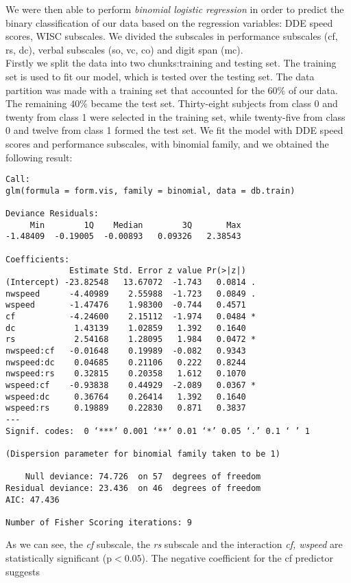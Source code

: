 \documentclass[11pt, a4paper, twoside, openright]{article}
\begin{document}
We were then able to perform \emph{binomial logistic regression} in
order to predict the binary classification of our data based on the
regression variables: DDE speed scores, WISC subscales. We divided the
subscales in performance subscales (cf, rs, dc), verbal subscales (so,
vc, co) and digit span (mc).\\
Firstly we split the data into two chunks:training and testing
set. The training set is used to fit our model, which is tested over
the testing set. The data partition was made with a training set that
accounted for the $60\%$ of our data. The remaining $40\%$ became the
test set. Thirty-eight subjects from class 0 and twenty from class 1
were selected in the training set, while twenty-five from class 0 and
twelve from class 1 formed the test set. We fit the model with DDE
speed scores and performance subscales, with binomial family, and we
obtained the following result:
\begin{verbatim}
Call:
glm(formula = form.vis, family = binomial, data = db.train)

Deviance Residuals: 
     Min        1Q    Median        3Q       Max  
-1.48409  -0.19005  -0.00893   0.09326   2.38543  

Coefficients:
             Estimate Std. Error z value Pr(>|z|)  
(Intercept) -23.82548   13.67072  -1.743   0.0814 .
nwspeed      -4.40989    2.55988  -1.723   0.0849 .
wspeed       -1.47476    1.98300  -0.744   0.4571  
cf           -4.24600    2.15112  -1.974   0.0484 *
dc            1.43139    1.02859   1.392   0.1640  
rs            2.54168    1.28095   1.984   0.0472 *
nwspeed:cf   -0.01648    0.19989  -0.082   0.9343  
nwspeed:dc    0.04685    0.21106   0.222   0.8244  
nwspeed:rs    0.32815    0.20358   1.612   0.1070  
wspeed:cf    -0.93838    0.44929  -2.089   0.0367 *
wspeed:dc     0.36764    0.26414   1.392   0.1640  
wspeed:rs     0.19889    0.22830   0.871   0.3837  
---
Signif. codes:  0 ‘***’ 0.001 ‘**’ 0.01 ‘*’ 0.05 ‘.’ 0.1 ‘ ’ 1

(Dispersion parameter for binomial family taken to be 1)

    Null deviance: 74.726  on 57  degrees of freedom
Residual deviance: 23.436  on 46  degrees of freedom
AIC: 47.436

Number of Fisher Scoring iterations: 9
\end{verbatim}
As we can see, the \emph{cf} subscale, the \emph{rs} subscale and the
interaction \emph{cf, wspeed} are statistically significant
(p$<0.05$). The negative coefficient for the cf predictor suggests
\end{document}
